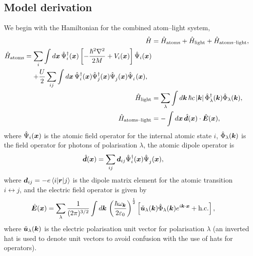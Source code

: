 \subsection{Model derivation}
\label{OpticalPumping:MultimodeModelDerivation}

We begin with the Hamiltonian for the combined atom--light system,
\begin{subequations}
    \label{OpticalPumping:AtomLightHamiltonian}
    \begin{align}
        \hat{H} &= \hat{H}_\text{atoms} + \hat{H}_\text{light} + \hat{H}_\text{atoms--light}, \\
        \begin{split}
            \hat{H}_\text{atoms} &= \sum_i \int d \vect{x}\, \hat{\Psi}_i^\dagger(\vect{x}) \left[ - \frac{\hbar^2 \nabla^2}{2 M} + V_i(\vect{x}) \right] \hat{\Psi}_i(\vect{x}) \\
            &\relphantom{=} + \frac{U}{2} \sum_{ij}\int d \vect{x}\, \hat{\Psi}_i^\dagger(\vect{x}) \hat{\Psi}_j^\dagger(\vect{x}) \hat{\Psi}_j^{\phantom{\dagger}}(\vect{x}) \hat{\Psi}_i^{\phantom{\dagger}}(\vect{x}),
        \end{split}\\
        \hat{H}_\text{light} &= \sum_\lambda \int d \vect{k}\, \hbar c \abs{\vect{k}} \hat{\Phi}_\lambda^\dagger(\vect{k}) \hat{\Phi}_\lambda(\vect{k}), \\
        \hat{H}_\text{atoms--light} &= - \int d \vect{x}\, \hat{\vect{d}}(\vect{x}) \cdot \hat{\vect{E}}(\vect{x}), \label{OpticalPumping:AtomLightCouplingHamiltonian}
    \end{align}
\end{subequations}
where $\hat{\Psi}_i(\bm{x})$ is the atomic field operator for the internal atomic state $i$, $\hat{\Phi}_\lambda(\bm{k})$ is the field operator for photons of polarisation $\lambda$, the atomic dipole operator is
\begin{align}
    \hat{\bm{d}}(\bm{x}) &= \sum_{ij}\bm{d}_{ij} \hat{\Psi}_i^\dagger(\bm{x}) \hat{\Psi}_j^{\phantom{\dagger}}(\bm{x}),
\end{align}
where $\bm{d}_{ij} = -e\left<i\middle|\bm{r}\middle|j\right>$ is the dipole matrix element for the atomic transition $i \leftrightarrow j$, and the electric field operator is given by
\begin{align}
    \hat{\bm{E}}(\bm{x}) &= \sum_\lambda \frac{1}{(2\pi)^{3/2}} \int d \bm{k}\, \left(\frac{\hbar \omega_{\bm{k}}}{2\varepsilon_0} \right)^{\frac{1}{2}} \left[\check{\bm{u}}_\lambda(\bm{k})  \hat{\Phi}_\lambda(\bm{k}) e^{i \bm{k} \cdot \bm{x}} + \text{h.c.}\right],
\end{align}
where $\check{\bm{u}}_\lambda(\bm{k})$ is the electric polarisation unit vector for polarisation $\lambda$ (an inverted hat is used to denote unit vectors to avoid confusion with the use of hats for operators).

